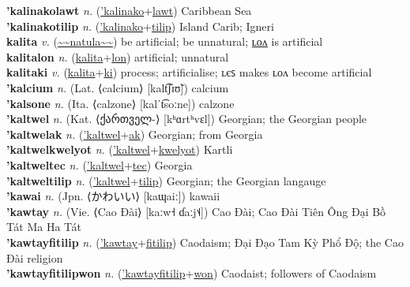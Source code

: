 \textbf{'kalinakolawt} \textit{n.} (\hyperref['kalinako]{'kalinako}+\hyperref[lawt]{lawt})
Caribbean Sea \label{'kalinakolawt} \\
\textbf{'kalinakotilip} \textit{n.} (\hyperref['kalinako]{'kalinako}+\hyperref[tilip]{tilip})
Island Carib; Igneri \label{'kalinakotilip} \\
\textbf{kalita} \textit{v.} (\hyperref[natula]{\~{}\~{}natula\~{}\~{}})
be artificial; be unnatural; \hyperref[kalitalon]{ʟᴏᴧ} is artificial \label{kalita} \\
\textbf{kalitalon} \textit{n.} (\hyperref[kalita]{kalita}+\hyperref[lon]{lon})
artificial; unnatural \label{kalitalon} \\
\textbf{kalitaki} \textit{v.} (\hyperref[kalita]{kalita}+\hyperref[ki]{ki})
process; artificialise; ʟєꜱ makes ʟᴏᴧ become artificial \label{kalitaki} \\
\textbf{'kalcium} \textit{n.} (Lat. ⟨calcium⟩ [kalt͡ʃɪʊ̃])
calcium \label{'kalcium} \\
\textbf{'kalsone} \textit{n.} (Ita. ⟨calzone⟩ [kalˈt͡soːne])
calzone \label{'kalsone} \\
\textbf{'kaltwel} \textit{n.} (Kat. ⟨ქართველ-⟩ [kʰɑrtʰvɛl])
Georgian; the Georgian people \label{'kaltwel} \\
\textbf{'kaltwelak} \textit{n.} (\hyperref['kaltwel]{'kaltwel}+\hyperref[ak]{ak})
Georgian; from Georgia \label{'kaltwelak} \\
\textbf{'kaltwelkwelyot} \textit{n.} (\hyperref['kaltwel]{'kaltwel}+\hyperref[kwelyot]{kwelyot})
Kartli \label{'kaltwelkwelyot} \\
\textbf{'kaltweltec} \textit{n.} (\hyperref['kaltwel]{'kaltwel}+\hyperref[tec]{tec})
Georgia \label{'kaltweltec} \\
\textbf{'kaltweltilip} \textit{n.} (\hyperref['kaltwel]{'kaltwel}+\hyperref[tilip]{tilip})
Georgian; the Georgian langauge \label{'kaltweltilip} \\
\textbf{'kawai} \textit{n.} (Jpn. ⟨かわいい⟩ [kaɰaiː])
kawaii \label{'kawai} \\
\textbf{'kawtay} \textit{n.} (Vie. ⟨Cao Đài⟩ [kaːw˧ ɗaːj˦˨])
Cao Đài; Cao Đài Tiên Ông Đại Bồ Tát Ma Ha Tát \label{'kawtay} \\
\textbf{'kawtayfitilip} \textit{n.} (\hyperref['kawtay]{'kawtay}+\hyperref[fitilip]{fitilip})
Caodaism; Đại Đạo Tam Kỳ Phổ Độ; the Cao Đài religion \label{'kawtayfitilip} \\
\textbf{'kawtayfitilipwon} \textit{n.} (\hyperref['kawtayfitilip]{'kawtayfitilip}+\hyperref[won]{won})
Caodaist; followers of Caodaism \label{'kawtayfitilipwon} \\
